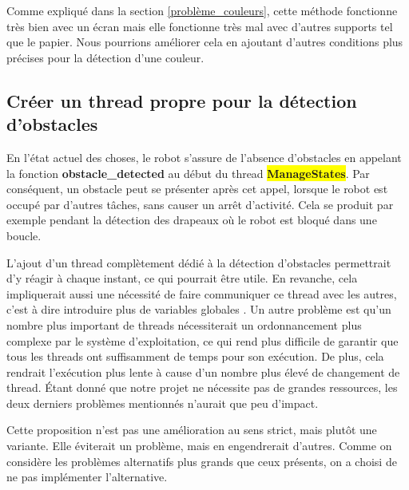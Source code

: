\documentclass{article}
\newcommand{\state}{\colorbox{yellow}{\textbf{ManageStates}}\xspace}
\begin{document}
    Comme expliqué dans la section \ref{problème_couleurs}, cette méthode fonctionne très bien avec un écran mais elle fonctionne très mal avec d'autres supports tel que le papier. Nous pourrions améliorer cela en ajoutant d'autres conditions plus précises pour la détection d'une couleur.

    \subsection{Créer un thread propre pour la détection d'obstacles}
    En l'état actuel des choses, le robot s'assure de l'absence d'obstacles en appelant la  fonction
    \textbf{obstacle\_detected} au début du thread \state.
    Par conséquent, un obstacle peut se présenter après cet appel, lorsque le robot est occupé par d'autres tâches, sans causer un arrêt d'activité.
    Cela se produit par exemple pendant la détection des drapeaux où le robot est bloqué dans une boucle.

    L'ajout d'un thread complètement dédié à la détection d'obstacles permettrait d'y réagir à chaque instant, ce qui pourrait être utile.
    En revanche, cela impliquerait aussi une nécessité de faire communiquer ce thread avec les autres, c'est à dire introduire plus de variables globales \cite{thread-communication}.
    Un autre problème est qu'un nombre plus important de threads nécessiterait un ordonnancement plus complexe par le système d'exploitation, ce qui rend plus difficile de garantir que tous les threads ont suffisamment de temps pour son exécution.
    De plus, cela rendrait l'exécution plus lente à cause d'un nombre plus élevé de changement de thread.
    Étant donné que notre projet ne nécessite pas de grandes ressources, les deux derniers problèmes mentionnés n'aurait que peu d'impact.
    
    Cette proposition n'est pas une amélioration au sens strict, mais plutôt une variante.
    Elle éviterait un problème, mais en engendrerait d'autres.
    Comme on considère les problèmes alternatifs plus grands que ceux présents, on a choisi de ne pas implémenter l'alternative.
    
\end{document}
